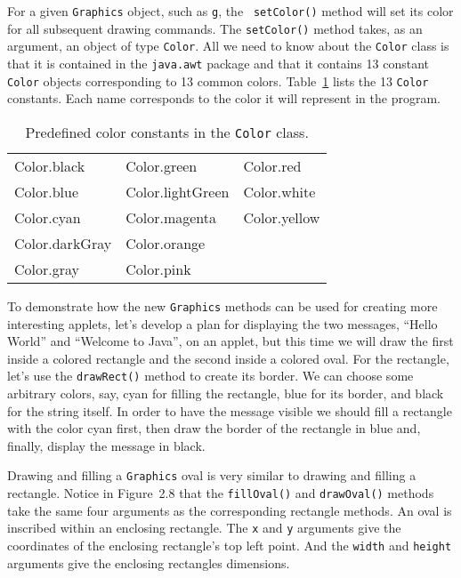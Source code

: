 For a given {\tt Graphics} object, such as {\tt g}, the {\tt
setColor()} method will set its color for all subsequent drawing
commands.  The {\tt setColor()} method takes, as an argument, an
object of type {\tt Color}.  All we need to know about the {\tt Color}
class is that it is contained in the {\tt java.awt} package and that
it contains 13 constant {\tt Color} objects corresponding to 13 common
colors.  Table~\ref{table-colors} lists the 13 {\tt Color}
constants. Each name corresponds to the color it will represent in the
program.

\begin{center}
\begin{table}[h]
\centering
\begin{tabular}{|l|l|l|} \hline
  Color.black & Color.green  & Color.red \\
  Color.blue & Color.lightGreen  & Color.white \\
  Color.cyan & Color.magenta  & Color.yellow \\
  Color.darkGray & Color.orange  &  \\
  Color.gray & Color.pink  &  \\ \hline
\end{tabular}
\caption{Predefined color constants in the {\tt Color} class.}
\label{table-colors}
\end{table}
\end{center}

To demonstrate how the new {\tt Graphics} methods can be used for
creating more interesting applets, let's develop a plan for displaying
the two messages, ``Hello World'' and ``Welcome to Java'', on an
applet, but this time we will draw the first inside a colored
rectangle and the second inside a colored oval. For the rectangle,
let's use the {\tt drawRect()} method to create its border.  We can
choose some arbitrary colors, say, cyan for filling the rectangle,
blue for its border, and black for the string itself. In order to have the
message visible we should fill a rectangle with the color cyan first,
then draw the border of the rectangle in blue and, finally, display
the message in black.

Drawing and filling a {\tt Graphics} oval is very similar to drawing
and filling a rectangle. Notice in Figure~2.8 that the
{\tt fillOval()} and {\tt drawOval()} methods take the same four
arguments as the corresponding rectangle methods.  An oval is
inscribed within an enclosing rectangle. The {\tt x} and {\tt y}
arguments give the coordinates of the enclosing rectangle's top left
point. And the {\tt width} and {\tt height} arguments give the
enclosing rectangles dimensions.


